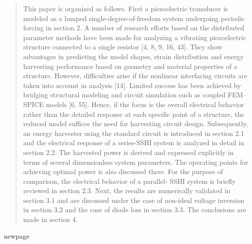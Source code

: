 \documentclass{article}
\begin{document}
\begin{quote}
    This paper is organized as follows. First a piezoelectric
    transducer is modeled as a lumped single-degree-of-freedom
    system undergoing periodic forcing in section 2. A number
    of research efforts based on the distributed parameter methods
    have been made for analyzing a vibrating piezoelectric
    structure connected to a single resistor [4, 8, 9, 16, 43].
    They show advantages in predicting the model shapes, strain
    distribution and energy harvesting performance based on
    geometry and material properties of a structure. However,
    difficulties arise if the nonlinear interfacing circuits are
    taken into account in analysis [14]. Limited success has
    been achieved by bridging structural modeling and circuit
    simulation such as coupled FEM–SPICE models [6, 55].
    Hence, if the focus is the overall electrical behavior rather than
    the detailed response at each specific point of a structure, the
    reduced model suffices the need for harvesting circuit design.
    Subsequently, an energy harvester using the standard circuit
    is introduced in section 2.1 and the electrical response of a
    series-SSHI system is analyzed in detail in section 2.2. The
    harvested power is derived and expressed explicitly in terms of
    several dimensionless system parameters. The operating points
    for achieving optimal power is also discussed there. For the
    purpose of comparison, the electrical behavior of a parallel-
    SSHI system is briefly reviewed in section 2.3. Next, the results
    are numerically validated in section 3.1 and are discussed
    under the case of non-ideal voltage inversion in section 3.2 and
    the case of diode loss in section 3.3. The conclusions are made
    in section 4.
\end{quote}





\newpage
newpage
\newpage
\end{document}
